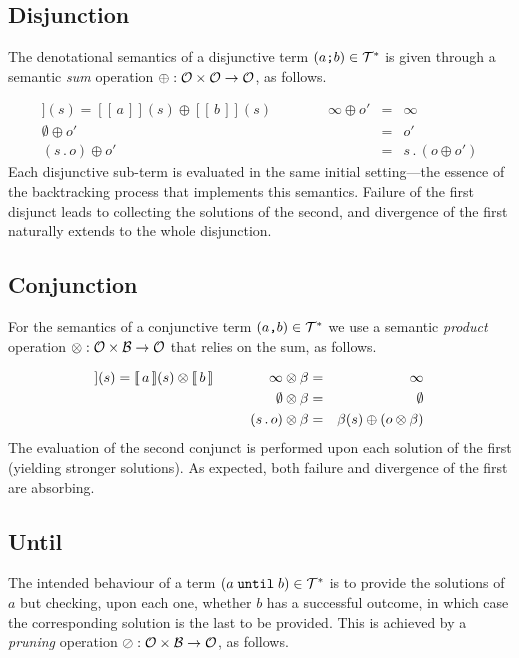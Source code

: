 \documentclass{tlp}
\def\B{{\cal B}}               \def\C{{\cal C}}               \def\E{{\cal E}}               \def\F{{\cal F}}
\def\denotstart{[\![\,}
\def\denotend{\,]\!]}
\def\denot#1{\denotstart#1\denotend}
\def\OO{\mathcal O}
\def\Out{\OO}
\def\oband{\texttt{,}}
\def\obor{\texttt{;}}
\def\obunt{\;\texttt{until}\;}
\def\ff{\emptyset}
\def\soutsym{{\,.\,}}
\def\sout#1#2{#1\soutsym#2}
\def\ssum{\oplus}
\def\sprod{\otimes}
\def\sprun{\oslash}
\begin{document}
\subsection{Disjunction}

The denotational semantics of a disjunctive term  $(a\obor b)\in\T^\ast$ is given through a
semantic \emph{sum} operation $\ssum:\Out\times\Out\map\Out$, as follows.

\vspace{-15pt}
\begin{eqnarray*}
\denot{a\obor b}(s)=\denot{a}(s)\ssum\denot{b}(s) \qquad\qquad \infty\ssum o'&=&\infty\\
\ff\ssum o'&=&o'\\
  (\sout so)\ssum o'&=&\sout s{(o\ssum o')}
\end{eqnarray*}
Each disjunctive sub-term is evaluated in the same initial setting---the essence
of the backtracking process that implements this semantics. Failure of the first disjunct
leads to collecting the solutions of the second, and divergence of the first
naturally extends to the whole disjunction.

\subsection{Conjunction}

For the semantics of a conjunctive term $(a\oband b)\in\T^\ast$ we use a semantic
\emph{product} operation $\sprod:\Out\times\B\map\Out$ that relies on the sum, as
follows.

\vspace{-15pt}
\begin{eqnarray*}
\denot{a\oband b}(s)=\denot{a}(s)\sprod\denot{b} \qquad\qquad
\infty\sprod \be&=&\infty\\
\ff\sprod\be&=&\ff\\
  (\sout so)\sprod \be&=&\be(s)\ssum(o\sprod\be)
\end{eqnarray*}
The evaluation of the second conjunct is performed upon each solution
of the first (yielding stronger solutions). As expected, both failure and
divergence of the first are absorbing.

\subsection{Until}

The intended behaviour of a term $(a\obunt b)\in\T^\ast$ is to provide the
solutions of $a$ but checking, upon each one, whether $b$ has a successful outcome,
in which case the corresponding solution is the last to be provided. This is
achieved by a \emph{pruning} operation $\sprun:\Out\times\B\map\Out$, as follows.
\end{document}
